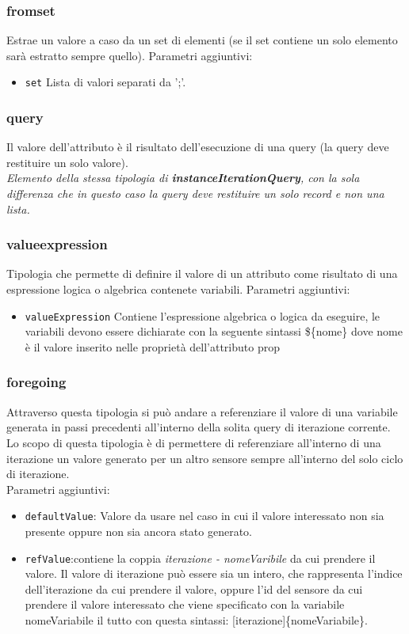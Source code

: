 \documentclass[12pt,a4paper,italian]{article}
\begin{document}

\subsubsection{fromset} Estrae un valore a caso da un set di elementi (se il set contiene un solo elemento sarà estratto sempre quello).
Parametri aggiuntivi:
\begin{itemize}
	\item \texttt{set} Lista di valori separati da ';'.
\end{itemize}
\subsubsection{query} Il valore dell'attributo è il risultato dell'esecuzione di una query (la query deve restituire un solo valore).\\
\newline
\emph{Elemento della stessa tipologia di \textbf{instanceIterationQuery}, con la sola differenza che in questo caso la query deve restituire un solo record e non una lista.}\\
\subsubsection{valueexpression} Tipologia che permette di definire il valore di un attributo come risultato di una espressione logica o algebrica contenete variabili.
Parametri aggiuntivi:
\begin{itemize}
	\item \texttt{valueExpression} Contiene l'espressione algebrica o logica da eseguire, le variabili devono essere dichiarate con la seguente sintassi \$\{nome\} dove nome è il valore inserito nelle proprietà dell'attributo prop
\end{itemize}
\subsubsection{foregoing} Attraverso questa tipologia si può andare a referenziare il valore di una variabile generata in passi precedenti all'interno della solita query di iterazione corrente.\\
Lo scopo di questa tipologia è di permettere di referenziare all'interno di una iterazione un valore generato per un altro sensore sempre all'interno del solo ciclo di iterazione.\\
Parametri aggiuntivi:
\begin{itemize}
	\item \texttt{defaultValue}: Valore da usare nel caso in cui il valore interessato non sia presente oppure non sia ancora stato generato.
	\item \texttt{refValue}:contiene la coppia \emph{iterazione - nomeVaribile} da cui prendere il valore. Il valore di iterazione può essere sia un intero, che rappresenta l'indice dell'iterazione 
	da cui prendere il valore, oppure l'id del sensore da cui prendere il valore interessato che viene specificato con la variabile nomeVariabile il tutto con questa sintassi: \@[iterazione]\{nomeVariabile\}.
\end{itemize}
\end{document}
